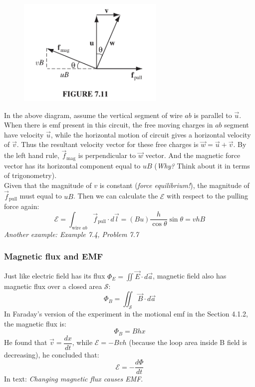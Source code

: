 \documentclass[12pt,a4paper,twoside]{article}
\numberwithin{equation}{section}
\begin{document}
\begin{figure}[ht]
    \centering
    \includegraphics[width=7cm]{250-Revision/emf-e-motion.png}
\end{figure}

\noindent In the above diagram, assume the vertical segment of wire $ab$ is parallel to $\overrightarrow{u}$. When there is emf present in this circuit, the free moving charges in $ab$ segment have velocity $\overrightarrow{u}$, while the horizontal motion of circuit gives a horizontal velocity of $\overrightarrow{v}$. Thus the resultant velocity vector for these free charges is $\overrightarrow{w}=\overrightarrow{u}+\overrightarrow{v}$. By the left hand rule, $\overrightarrow{f}_{\mathrm{mag}}$ is perpendicular to $\overrightarrow{w}$ vector. And the magnetic force vector has its horizontal component equal to $uB$ (\textit{Why?} Think about it in terms of trigonometry). \\

\noindent Given that the magnitude of $v$ is constant (\textit{force equilibrium!}), the magnitude of $\overrightarrow{f}_{\mathrm{pull}}$ must equal to $uB$. Then we can calculate the $\mathcal{E}$ with respect to the pulling force again:
\[\mathcal{E}=\int_{\textrm{wire } ab}\overrightarrow{f}_{\mathrm{pull}}\cdot d\overrightarrow{l}=(Bu)\frac{h}{\cos\theta}\sin\theta =vhB\]
\textit{Another example: Example 7.4, Problem 7.7}

\subsubsection{Magnetic flux and EMF}
Just like electric field has its flux $\Phi_{E}=\iint\overrightarrow{E}\cdot d\overrightarrow{a}$, magnetic field also has magnetic flux over a closed area $\mathcal{S}$:
\begin{equation}
    \Phi_{B}=\iint_{\mathcal{S}}\overrightarrow{B}\cdot d\overrightarrow{a}
    \label{eq: B-flux}
\end{equation}
In Faraday's version of the experiment in the motional emf in the Section 4.1.2, the magnetic flux is:
\[\Phi_{B}=Bhx\]
He found that $\overrightarrow{v}=\dfrac{dx}{dt}$, while $\mathcal{E}=-Bvh$ (because the loop area inside B field is decreasing), he concluded that:
\begin{equation}
    \boxed{
    \mathcal{E}=-\frac{d\Phi}{dt}
    }
    \label{eq: EMF-flux}
\end{equation}
In text: \textit{Changing magnetic flux causes EMF}.
\end{document}
